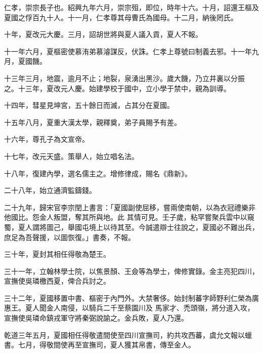 \begin{pinyinscope}
 仁孝，崇宗長子也。紹興九年六月，崇宗殂，即位，時年十六。十月，詔還王樞及夏國之俘百九十人。十一月，仁孝尊其母曹氏為國母。十二月，納後罔氏。



 十年，夏改元大慶。三月，詔胡世將與夏人議入貢，夏人不報。



 十一年六月，夏樞密使慕洧弟慕濬謀反，伏誅。仁孝上尊號曰制義去邪。十一年九月，夏國饑。



 十三年三月，地震，逾月不止；地裂，泉湧出黑沙。歲大饑，乃立井裏以分振
 之。十三年，夏改元人慶。始建學校于國中，立小學于禁中，親為訓導。



 十四年，彗星見坤宮，五十餘日而滅，占其分在夏國。



 十五年八月，夏重大漢太學，親釋奠，弟子員賜予有差。



 十六年，尊孔子為文宣帝。



 十七年，改元天盛。策舉人，始立唱名法。



 十八年，復建內學，選名儒主之。增修律成，賜名《鼎新》。



 二十八年，始立通濟監鑄錢。



 二十九年，歸宋官李宗閏上書言：「夏國副使屈移，嘗兩使南朝，以為衣冠禮樂非他國比。怨金人叛盟，奪其所與地。此
 其情可見。壬子歲，粘罕嘗聚兵雲中以窺蜀，夏人謂將圖己，舉國屯境上以待其至。今誠遣辯士往說之，夏國必不難出兵，庶足為吾聲援，以圖恢復。」書奏，不報。



 三十年，夏封其相任得敬為楚王。



 三十一年，立翰林學士院，以焦景顏、王僉等為學士，俾修實錄。金主亮犯四川，宣撫使吳璘檄西夏，俾合兵討之。



 三十二年，夏國移置中書、樞密于內門外。大禁奢侈。始封制蕃字師野利仁榮為廣惠王。夏人聞金人南侵，以騎兵二千至蔡園川及
 馬家才、禿頭嶺，將分道入攻，宣撫使吳璘命鎮戎軍守將秦弼說諭之。金兵敗，夏人乃還。



 乾道三年五月，夏國相任得敬遣間使至四川宣撫司，約共攻西蕃，虞允文報以蠟書。七月，得敬間使再至宣撫司，夏人獲其帛書，傳至金人。




\end{pinyinscope}
